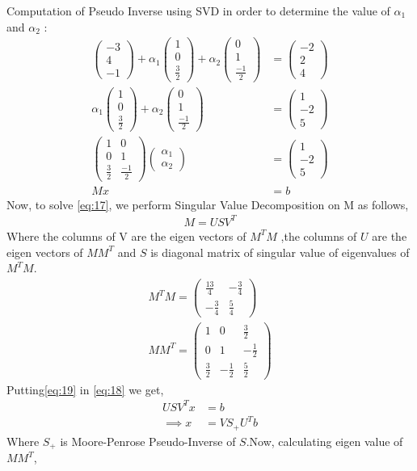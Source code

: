 \documentclass[journal,12pt,twocolumn]{IEEEtran}
\newcommand{\myvec}[1]{\ensuremath{\begin{pmatrix}#1\end{pmatrix}}}
\begin{document}
Computation of Pseudo Inverse using SVD in order to determine the value of $\alpha_1$ and $\alpha_2$ :
\begin{align}
\myvec{-3\\4\\-1} + \alpha_1\myvec{1\\0\\\frac{3}{2}} + \alpha_2\myvec{0\\1\\\frac{-1}{2}} &= \myvec{-2\\2\\4}\label{eq:15}\\
\alpha_1\myvec{1\\0\\\frac{3}{2}} + \alpha_2\myvec{0\\1\\\frac{-1}{2}}  &= \myvec{1\\-2\\5}\label{eq:16}\\
\myvec{1 & 0\\0 & 1\\\frac{3}{2} & \frac{-1}{2}} \myvec{\alpha_1\\\alpha_2}  &= \myvec{1\\-2\\5}\label{eq:17}\\
M x &= b\label{eq:18}
\end{align}
Now, to solve \eqref{eq:17}, we perform Singular Value Decomposition on M as follows,
\begin{align}
M=USV^T\label{eq:19}
\end{align}
Where the columns of V are the eigen vectors of $M^TM$ ,the columns of $U$ are the eigen vectors of $MM^T$ and $S$ is diagonal matrix of singular value of eigenvalues of $M^TM$.
\begin{align}
M^TM=\myvec{\frac{13}{4}& -\frac{3}{4}\\ -\frac{3}{4}&\frac{5}{4}}\label{eq:20}\\
MM^T=\myvec{1&0& \frac{3}{2}\\0&1& -\frac{1}{2}\\ \frac{3}{2}&-\frac{1}{2}& \frac{5}{2}}
\end{align}
Putting\eqref{eq:19} in \eqref{eq:18} we get,
\begin{align}
USV^Tx & = b\\
\implies x &= VS_+U^Tb\label{eq:23}
\end{align}
Where $S_+$ is Moore-Penrose Pseudo-Inverse of $S$.Now, calculating eigen value of $MM^T$,
\end{document}
